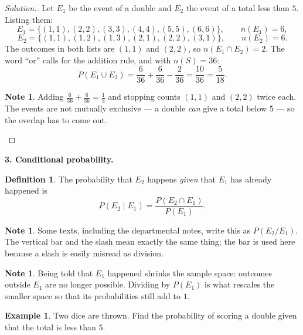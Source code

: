 \documentclass[11pt,a4paper]{article}
\theoremstyle{definition}
\newtheorem{definition}[thm]{Definition}
\newtheorem{example}[thm]{Example}
\newtheorem{note}[thm]{Note}
\newenvironment{solution}
  {\renewcommand{\qedsymbol}{}\begin{proof}[\textit{Solution}.]}
  {\end{proof}}
\begin{document}
\begin{solution}
Let $E_1$ be the event of a double and $E_2$ the event of a total less than $5$. Listing
them:
$$E_1=\{(1,1),(2,2),(3,3),(4,4),(5,5),(6,6)\},\qquad n\left(E_1\right)=6,$$
$$E_2=\{(1,1),(1,2),(1,3),(2,1),(2,2),(3,1)\},\qquad n\left(E_2\right)=6.$$
The outcomes in both lists are $(1,1)$ and $(2,2)$, so $n\left(E_1\cap E_2\right)=2$.
The word ``or'' calls for the addition rule, and with $n(S)=36$:
$$P\left(E_1\cup E_2\right)=\frac{6}{36}+\frac{6}{36}-\frac{2}{36}=\frac{10}{36}
=\frac{5}{18}.$$

\begin{note}
Adding $\frac{6}{36}+\frac{6}{36}=\frac{1}{3}$ and stopping counts $(1,1)$ and $(2,2)$
twice each. The events are not mutually exclusive --- a double \emph{can} give a total
below $5$ --- so the overlap has to come out.
\end{note}
\end{solution}

\textbf{3. Conditional probability.}

\begin{definition}
The probability that $E_2$ happens \emph{given} that $E_1$ has already happened is
$$P\left(E_2\mid E_1\right)=\frac{P\left(E_2\cap E_1\right)}{P\left(E_1\right)}.$$
\end{definition}

\begin{note}
Some texts, including the departmental notes, write this as $P(E_2/E_1)$. The vertical
bar and the slash mean exactly the same thing; the bar is used here because a slash is
easily misread as division.
\end{note}

\begin{note}
Being told that $E_1$ happened shrinks the sample space: outcomes outside $E_1$ are no
longer possible. Dividing by $P(E_1)$ is what rescales the smaller space so that its
probabilities still add to $1$.
\end{note}

\begin{example}
Two dice are thrown. Find the probability of scoring a double given that the total is
less than $5$.
\end{example}
\end{document}

